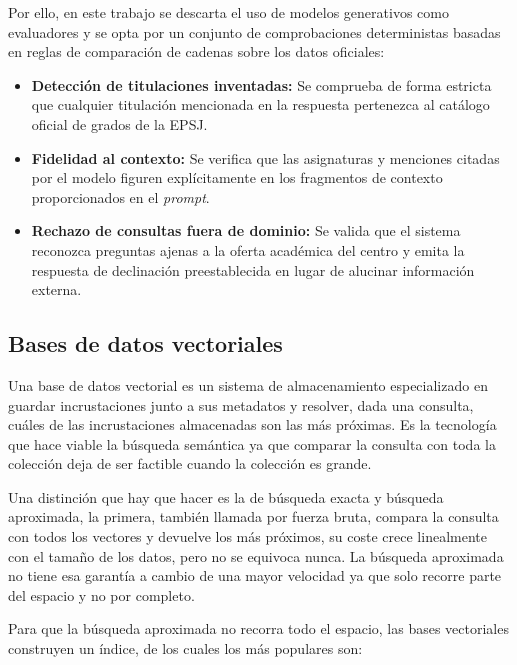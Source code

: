 Por ello, en este trabajo se descarta el uso de modelos generativos como evaluadores y se opta por un conjunto de comprobaciones deterministas basadas en reglas de comparación de cadenas sobre los datos oficiales:

\begin{itemize}
  \item \textbf{Detección de titulaciones inventadas:} Se comprueba de forma estricta que cualquier titulación mencionada en la respuesta pertenezca al catálogo oficial de grados de la EPSJ.
  \item \textbf{Fidelidad al contexto:} Se verifica que las asignaturas y menciones citadas por el modelo figuren explícitamente en los fragmentos de contexto proporcionados en el \textit{prompt}.
  \item \textbf{Rechazo de consultas fuera de dominio:} Se valida que el sistema reconozca preguntas ajenas a la oferta académica del centro y emita la respuesta de declinación preestablecida en lugar de alucinar información externa.
\end{itemize}


\subsection{Bases de datos vectoriales}
\label{subsec:vectordb_concepto}

Una base de datos vectorial\cite{pan2024vectordb} es un sistema de almacenamiento especializado en guardar incrustaciones junto a sus metadatos y resolver, dada una consulta, cuáles de las incrustaciones almacenadas son las más próximas. Es la tecnología que hace viable la búsqueda semántica ya que comparar la consulta con toda la colección deja de ser factible cuando la colección es grande.

Una distinción que hay que hacer es la de búsqueda exacta y búsqueda aproximada, la primera, también llamada por fuerza bruta, compara la consulta con todos los vectores y devuelve los más próximos, su coste crece linealmente con el tamaño de los datos, pero no se equivoca nunca. La búsqueda aproximada no tiene esa garantía a cambio de una mayor velocidad ya que solo recorre parte del espacio y no por completo.

Para que la búsqueda aproximada no recorra todo el espacio, las bases vectoriales construyen un índice, de los cuales los más populares son:

